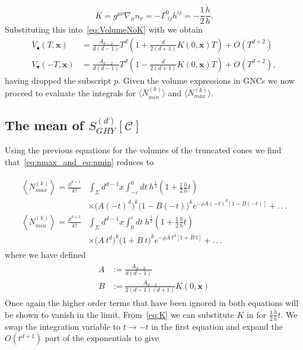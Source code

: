 \documentclass[12pt]{article}
\newcommand{\be}{\begin{equation}}
\newcommand{\ee}{\end{equation}}
\begin{document}
\be\label{eq:K}
K
=g^{\mu\nu }\nabla_{\mu}n_{\nu}
=-\Gamma^{0}_{\;ij}h^{ij}=-\frac{1}{2}\frac{\dot{h}}{h}.
\ee
Substituting this into~\eqref{eq:VolumeNoK} with we obtain 
\begin{align}
V_\blacktriangle(T,\mathbf x)
&=\frac{A_{d-2}}{d(d-1)}T^d\left(1+\frac{d}{2(d+1)}K(0,\mathbf{x})T\right)
+O(T^{d+2}) \label{eq:TopVolumeWithK}\\
V_\blacktriangledown(-T,\mathbf x)
&=\frac{A_{d-2}}{d(d-1)}T^d\left(1-\frac{d}{2(d+1)}K(0,\mathbf{x})T\right)
+O(T^{d+2}), \label{eq:BottomVolumeWithK}
\end{align}
having dropped the subscript $p$. Given the volume expressions in GNCs we now proceed to evaluate the integrals for $\langle N_{min}^{(k)}\rangle $ and $\langle N_{max}^{(k)}\rangle$.

\subsection{The mean of $S^{(d)}_{GHY}[\mathcal C]$}

Using the previous equations for the volumes of the truncated cones we find that~\eqref{eq:nmax_and_eq:nmin} reduces to

\begin{gather}\label{eq:nmax_and_eq:nmin_volume_expanded}
\begin{aligned}
\left\langle N_{max}^{(k)}\right\rangle = \frac{\rho^{k+1}}{k!} & \int_{\Sigma}d^{d-1}x\int_{-\varepsilon}^{0}dt\:
h^{\frac{1}{2}}\left(1+
\frac{1}{2}\frac{\dot{h}}{h}t\right)
 \\
 & \times \Big( A(-t)^d \Big)^k 
 \Big( 1 - B(-t) \Big)^k
 e^{-\rho A(-t)^d \left[1-B(-t) \right]} + .\,.\,.
\\
\left\langle N_{min}^{(k)}\right\rangle = \frac{\rho^{k+1}}{k!} & \int_{\Sigma}d^{d-1}x\int_{0}^{\varepsilon}dt\:
h^{\frac{1}{2}}\left(1+
\frac{1}{2}\frac{\dot{h}}{h}t\right)
 \\
 & \times \Big( A\: t^d \Big)^k 
 \Big( 1 + B\: t \Big)^k
 e^{-\rho A\: t^d \left[1+B\: t \right]} + .\,.\,.
\end{aligned}
\end{gather}
where we have defined
\begin{gather}\label{A_and_B_defn}
\begin{aligned}
A & := \frac{A_{d-2}}{d(d-1)} \\
B & := \frac{A_{d-2}}{2(d-1)(d+1)}K(0,\mathbf{x})
\end{aligned}
\end{gather}
Once again the higher order terms that have been ignored in both equations will be shown to vanish in the limit. From~\eqref{eq:K} we can substitute $K$ in for $\frac{1}{2}\frac{\dot{h}}{h}t$. We swap the integration variable to $t\rightarrow -t$ in the first equation and expand the $O(t^{d+1})$ part of the exponentials to give
\end{document}
